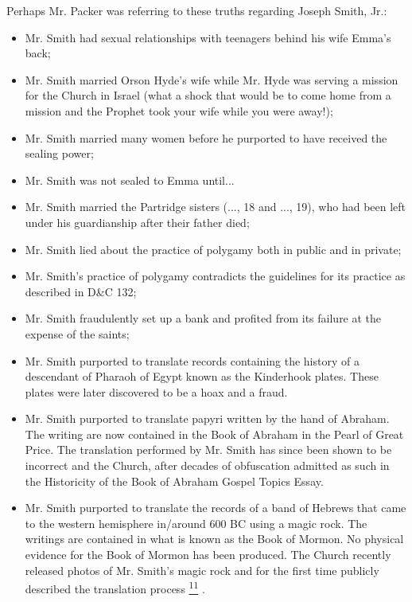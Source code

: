 \documentclass[a4paper]{article}
\providecommand*{\DUfootnotemark}[3]{%
  \raisebox{1em}{\hypertarget{#1}{}}%
  \hyperlink{#2}{\textsuperscript{#3}}%
}
\begin{document}
Perhaps Mr. Packer was referring to these truths regarding Joseph Smith, Jr.:
%
\begin{itemize}

\item Mr. Smith had sexual relationships with teenagers behind his wife Emma's back;

\item Mr. Smith married Orson Hyde's wife while Mr. Hyde was serving a mission for the Church in Israel (what a shock that would be to come home from a mission and the Prophet took your wife while you were away!);

\item Mr. Smith married many women before he purported to have received the sealing power;

\item Mr. Smith was not sealed to Emma until...

\item Mr. Smith married the Partridge sisters (..., 18 and ..., 19), who had been left under his guardianship after their father died;

\item Mr. Smith lied about the practice of polygamy both in public and in private;

\item Mr. Smith's practice of polygamy contradicts the guidelines for its practice as described in D\&C 132;

\item Mr. Smith fraudulently set up a bank and profited from its failure at the expense of the saints;

\item Mr. Smith purported to translate records containing the history of a descendant of Pharaoh of Egypt known as the Kinderhook plates.  These plates were later discovered to be a hoax and a fraud.

\item Mr. Smith purported to translate papyri written by the hand of Abraham.  The writing are now contained in the Book of Abraham in the Pearl of Great Price.  The translation performed by Mr. Smith has since been shown to be incorrect and the Church, after decades of obfuscation admitted as such in the Historicity of the Book of Abraham Gospel Topics Essay.

\item Mr. Smith purported to translate the records of a band of Hebrews that came to the western hemisphere in/around 600 BC using a magic rock.  The writings are contained in what is known as the Book of Mormon.  No physical evidence for the Book of Mormon has been produced.  The Church recently released photos of Mr. Smith's magic rock and for the first time publicly described the translation process\DUfootnotemark{id5}{id22}{11}.


\end{itemize}
\end{document}

